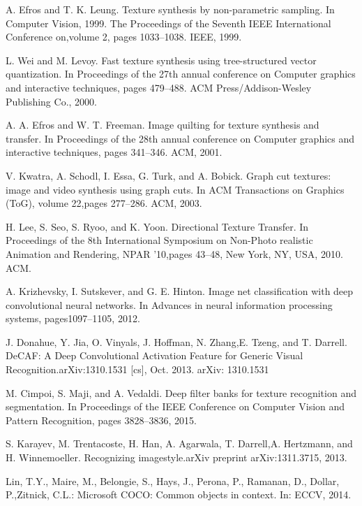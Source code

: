 \newpage
\begin{thebibliography}{9}
A. Efros and T. K. Leung.  Texture synthesis by non-parametric sampling. In Computer Vision, 1999. The Proceedings of the Seventh IEEE International Conference on,volume 2, pages 1033–1038. IEEE, 1999.

L. Wei and M. Levoy.  Fast texture synthesis using tree-structured vector quantization. In Proceedings of the 27th annual conference on Computer graphics and interactive techniques, pages 479–488. ACM Press/Addison-Wesley Publishing Co., 2000.

A. A. Efros and W. T. Freeman.  Image quilting for texture synthesis and transfer. In Proceedings of the 28th annual conference on Computer graphics and interactive techniques, pages 341–346. ACM, 2001.

V. Kwatra, A. Schodl, I. Essa, G. Turk, and A. Bobick. Graph cut textures: image and video synthesis using graph cuts. In ACM Transactions on Graphics (ToG), volume 22,pages 277–286. ACM, 2003.

H. Lee, S. Seo, S. Ryoo, and K. Yoon. Directional Texture Transfer. In Proceedings of the 8th International Symposium on Non-Photo realistic Animation and Rendering, NPAR ’10,pages 43–48, New York, NY, USA, 2010. ACM.

A. Krizhevsky, I. Sutskever, and G. E. Hinton.  Image net classification with deep convolutional neural networks. In Advances in neural information processing systems, pages1097–1105, 2012.

J. Donahue, Y. Jia, O. Vinyals, J. Hoffman, N. Zhang,E. Tzeng, and T. Darrell.   DeCAF: A Deep Convolutional Activation Feature for Generic Visual Recognition.arXiv:1310.1531 [cs], Oct. 2013. arXiv: 1310.1531

M. Cimpoi, S. Maji, and A. Vedaldi. Deep filter banks for texture recognition and segmentation. In Proceedings of the IEEE Conference on Computer Vision and Pattern Recognition, pages 3828–3836, 2015.

S. Karayev, M. Trentacoste, H. Han, A. Agarwala, T. Darrell,A. Hertzmann, and H. Winnemoeller.  Recognizing imagestyle.arXiv preprint arXiv:1311.3715, 2013.

Lin, T.Y., Maire, M., Belongie, S., Hays, J., Perona, P., Ramanan, D., Dollar, P.,Zitnick, C.L.:  Microsoft COCO: Common objects in context.  In: ECCV, 2014. 


\end{thebibliography}
